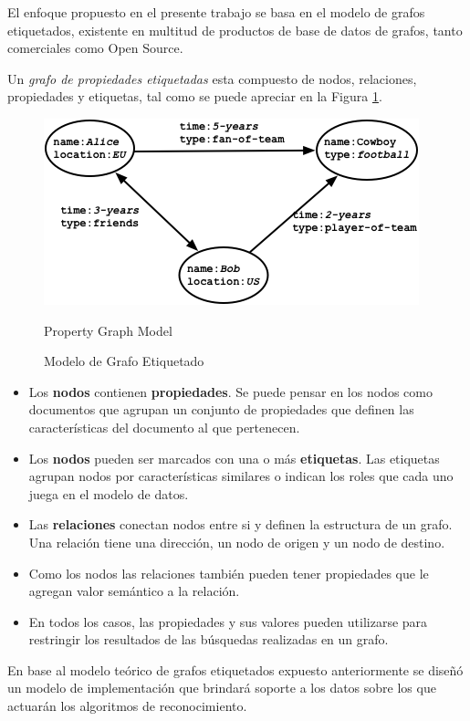 	El enfoque propuesto en el presente trabajo se basa en el modelo de grafos etiquetados, existente en multitud de productos de base de datos de grafos, tanto comerciales como Open Source.
	
	Un \emph{grafo de propiedades etiquetadas} esta compuesto de nodos, relaciones, propiedades y etiquetas, tal como se puede apreciar en la Figura \ref{fig:property-graph-model}.
	
	\begin{figure}[h]
		\centering
		\includegraphics[scale=0.5]{./images/property-graph-model}
		\ifdefined\ingles
			\caption{Property Graph Model}
		\else
			\caption{Modelo de Grafo Etiquetado}
		\fi
		\label{fig:property-graph-model}
	\end{figure}
	
	
	\begin{itemize}
		\item Los \textbf{nodos} contienen \textbf{propiedades}. Se puede pensar en los nodos como documentos que agrupan un conjunto de propiedades que definen las características del documento al que pertenecen. 
		\item Los \textbf{nodos} pueden ser marcados con una o más \textbf{etiquetas}. Las etiquetas agrupan nodos por características similares o indican los roles que cada uno juega en el modelo de datos.
		\item Las \textbf{relaciones} conectan nodos entre si y definen la estructura de un grafo. Una relación tiene una dirección, un nodo de origen y un nodo de destino.
		\item Como los nodos las relaciones también pueden tener propiedades que le agregan valor semántico a la relación.
		\item En todos los casos, las propiedades y sus valores pueden utilizarse para restringir los resultados de las búsquedas realizadas en un grafo.
	\end{itemize}
	
	En base al modelo teórico de grafos etiquetados expuesto anteriormente se diseñó un modelo de implementación que brindará soporte a los datos sobre los que actuarán los algoritmos de reconocimiento.
	
